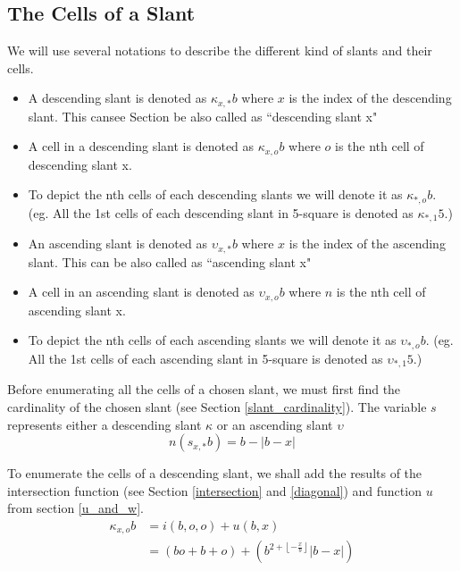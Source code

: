 \documentclass[letterpaper, twoside,12pt]{article}
\begin{document}
    \subsection{The Cells of a Slant} \label{cells_of_a_slant}
    We will use several notations to describe the different kind of slants and their cells.
    \begin{itemize}
        \item A descending slant is denoted as $\kappa_{x,*}b$ where $x$ is the index of the descending slant. This cansee Section be also called as ``descending slant x"
        \item A cell in a descending slant is denoted as $\kappa_{x,o}b$ where $o$ is the nth cell of descending slant x.
        \item To depict the nth cells of each descending slants we will denote it as $\kappa_{*,o}b$. (eg. All the 1st cells of each descending slant in 5-square is denoted as $\kappa_{*,1}5$.)
        \item An ascending slant is denoted as $\upsilon_{x,*}b$ where $x$ is the index of the ascending slant. This can be also called as ``ascending slant x"
        \item A cell in an ascending slant is denoted as $\upsilon_{x,o}b$ where $n$ is the nth cell of ascending slant x.
        \item To depict the nth cells of each ascending slants we will denote it as $\upsilon_{*,o}b$. (eg. All the 1st cells of each ascending slant in 5-square is denoted as $\upsilon_{*,1}5$.)
    \end{itemize}

    Before enumerating all the cells of a chosen slant, we must first find the cardinality of the chosen slant (see Section \ref{slant_cardinality}). The variable $s$ represents either a descending slant $\kappa$ or an ascending slant $\upsilon$
    \begin{equation}
        n(s_{x,*}b) = b - |b-x|
    \end{equation}


    To enumerate the cells of a descending slant, we shall add the results of the intersection function (see Section \ref{intersection} and \ref{diagonal}) and function $u$ from section \ref{u_and_w}.
    \begin{equation}
        \begin{split}
            \kappa_{x,o}b &= i(b,o,o) + u(b,x) \\
                &= (bo + b + o) + (b^{2 + \left\lfloor -\frac{x}{b} \right\rfloor }|b-x|)
        \end{split}
    \end{equation}
\end{document}
